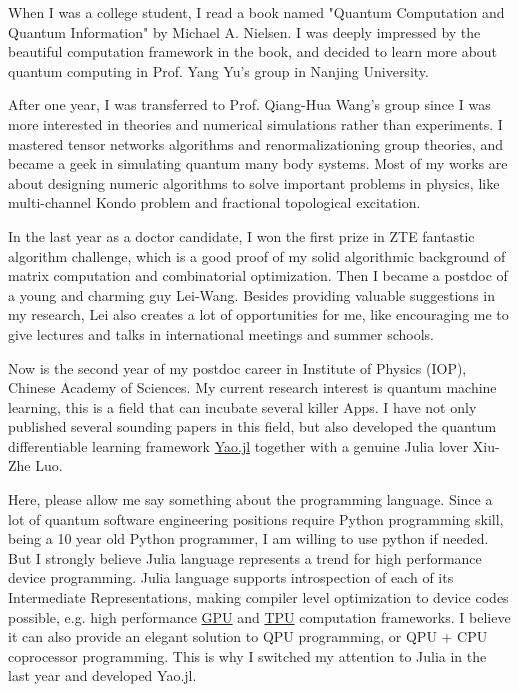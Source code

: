 \documentclass[letterpaper]{article}
\renewenvironment{itemize}{
  \begin{list}{}{
    \setlength{\leftmargin}{1.5em}
  }
}{
  \end{list}
}
\begin{document}
\begin{itemize}
    \item [1] When I was a college student, I read a book named "Quantum Computation and Quantum Information" by Michael A. Nielsen.
        I was deeply impressed by the beautiful computation framework in the book, and decided to learn more about quantum computing in Prof. Yang Yu's group in Nanjing University.
    \item [2] After one year, I was transferred to Prof. Qiang-Hua Wang's group since I was more interested in theories and numerical simulations rather than experiments. I mastered tensor networks algorithms and renormalizationing group theories, and became a geek in simulating quantum many body systems. Most of my works are about designing numeric algorithms to solve important problems in physics, like multi-channel Kondo problem and fractional topological excitation.
    \item [3] In the last year as a doctor candidate, I won the first prize in ZTE fantastic algorithm challenge, which is a good proof of my solid algorithmic background of matrix computation and combinatorial optimization. Then I became a postdoc of a young and charming guy Lei-Wang. Besides providing valuable suggestions in my research, Lei also creates a lot of opportunities for me, like encouraging me to give lectures and talks in international meetings and summer schools.
    \item [4] Now is the second year of my postdoc career in Institute of Physics (IOP), Chinese Academy of Sciences. My current research interest is quantum machine learning, this is a field that can incubate several killer Apps. I have not only published several sounding papers in this field, but also developed the quantum differentiable learning framework \href{https://github.com/QuantumBFS/Yao.jl}{Yao.jl} together with a genuine Julia lover Xiu-Zhe Luo.
    \item [5] Here, please allow me say something about the programming language. Since a lot of quantum software engineering positions require Python programming skill, being a 10 year old Python programmer, I am willing to use python if needed.
        But I strongly believe Julia language represents a trend for high performance device programming.
        Julia language supports introspection of each of its Intermediate Representations, making compiler level optimization to device codes possible, e.g. high performance \href{https://arxiv.org/abs/1712.03112}{GPU} and \href{https://medium.com/syncedreview/google-cloud-tpus-now-speak-julia-cefd15a2a060}{TPU} computation frameworks.
        I believe it can also provide an elegant solution to QPU programming, or QPU + CPU coprocessor programming. This is why I switched my attention to Julia in the last year and developed Yao.jl.
\end{itemize}
\end{document}
